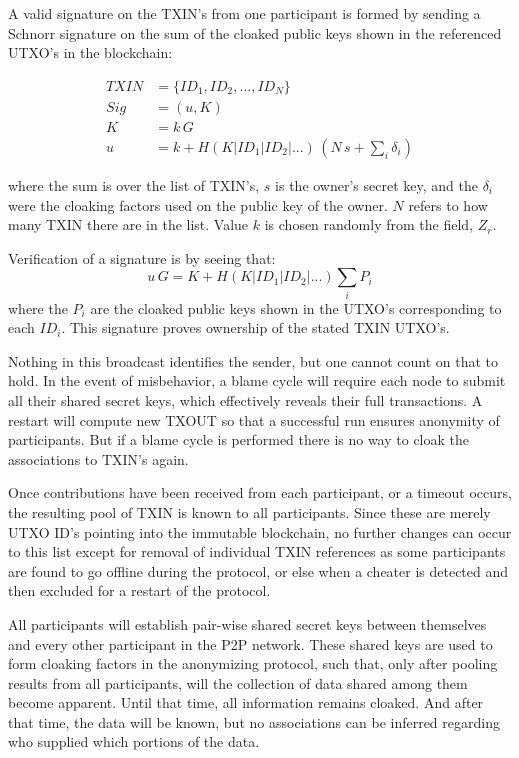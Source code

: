 \documentclass[a4paper, 10pt, conference]{ieeeconf}
\begin{document}
A valid signature on the TXIN's from one participant is formed by sending a Schnorr signature on the sum of the cloaked public keys shown in the referenced UTXO's in the blockchain:

\begin{align*}
TXIN &= \{ID_1, ID_2, ..., ID_N\}\\
Sig &= (u, K)\\
K &= k \, G \\
u &= k + H(K | ID_1 | ID_2 | ...) \, (N \, s + \sum_i{\delta_i})
\end{align*}

where the sum is over the list of TXIN's, $s$ is the owner's secret key, and the $\delta_i$ were the cloaking factors used on the public key of the owner. $N$ refers to how many TXIN there are in the list. Value $k$ is chosen randomly from the field, $Z_r$. 

Verification of a signature is by seeing that:
$$u \, G = K + H(K | \mathit{ID}_1 | \mathit{ID}_2 | ...) \sum_i{P_i}$$
where the $P_i$ are the cloaked public keys shown in the UTXO's corresponding to each $\mathit{ID}_i$. This signature proves ownership of the stated TXIN UTXO's.

Nothing in this broadcast identifies the sender, but one cannot count on that to hold. In the event of misbehavior, a blame cycle will require each node to submit all their shared secret keys, which effectively reveals their full transactions. A restart will compute new TXOUT so that a successful run ensures anonymity of participants. But if a blame cycle is performed there is no way to cloak the associations to TXIN's again.

Once contributions have been received from each participant, or a timeout occurs, the resulting pool of TXIN is known to all participants. Since these are merely UTXO ID's pointing into the immutable blockchain, no further changes can occur to this list except for removal of individual TXIN references as some participants are found to go offline during the protocol, or else when a cheater is detected and then excluded for a restart of the protocol.

All participants will establish pair-wise shared secret keys between themselves and every other participant in the P2P network. These shared keys are used to form cloaking factors in the anonymizing protocol, such that, only after pooling results from all participants, will the collection of data shared among them become apparent. Until that time, all information remains cloaked. And after that time, the data will be known, but no associations can be inferred regarding who supplied which portions of the data. 
\end{document}
